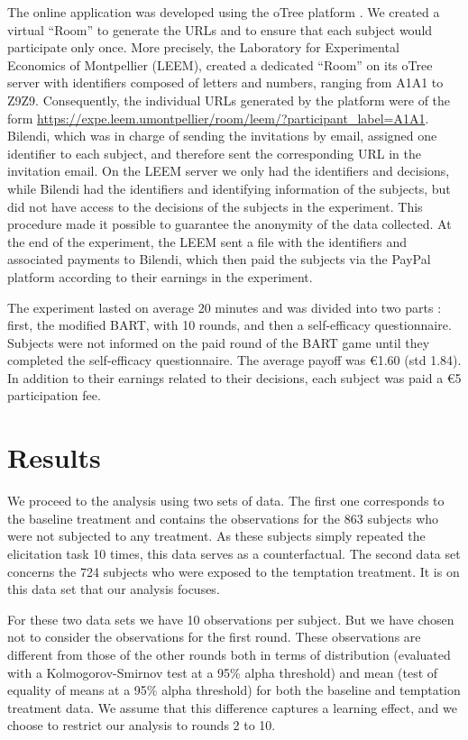 \documentclass[
]{book}
\begin{document}
The online application was developed using the oTree platform \citet{chen2016}.
We created a virtual ``Room'' to generate the URLs and to ensure that each subject would participate only once.
More precisely, the Laboratory for Experimental Economics of Montpellier (LEEM), created a dedicated ``Room'' on its oTree server with identifiers composed of letters and numbers, ranging from A1A1 to Z9Z9.
Consequently, the individual URLs generated by the platform were of the form \url{https://expe.leem.umontpellier/room/leem/?participant_label=A1A1}.
Bilendi, which was in charge of sending the invitations by email, assigned one identifier to each subject, and therefore sent the corresponding URL in the invitation email.
On the LEEM server we only had the identifiers and decisions, while Bilendi had the identifiers and identifying information of the subjects, but did not have access to the decisions of the subjects in the experiment.
This procedure made it possible to guarantee the anonymity of the data collected.
At the end of the experiment, the LEEM sent a file with the identifiers and associated payments to Bilendi, which then paid the subjects via the PayPal platform according to their earnings in the experiment.

The experiment lasted on average 20 minutes and was divided into two parts :
first, the modified BART, with 10 rounds, and then a self-efficacy questionnaire.
Subjects were not informed on the paid round of the BART game until they completed the self-efficacy questionnaire.
The average payoff was €1.60 (std 1.84).
In addition to their earnings related to their decisions, each subject was paid a €5 participation fee.

\hypertarget{result2}{%
\section{Results}\label{result2}}

We proceed to the analysis using two sets of data.
The first one corresponds to the baseline treatment and contains the
observations for the 863 subjects who were not
subjected to any treatment.
As these subjects simply repeated the elicitation task 10 times, this data
serves as a counterfactual.
The second data set concerns the 724 subjects
who were exposed to the temptation treatment.
It is on this data set that our analysis focuses.

For these two data sets we have 10 observations per subject.
But we have chosen not to consider the observations for the first round.
These observations are different from those of the other rounds both in terms of
distribution (evaluated with a Kolmogorov-Smirnov test at a 95\% alpha threshold)
and mean (test of equality of means at a 95\% alpha threshold) for both the
baseline and temptation treatment data.
We assume that this difference captures a learning effect, and we choose to
restrict our analysis to rounds 2 to 10.
\end{document}
